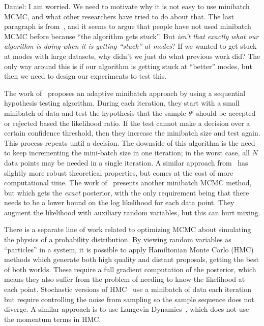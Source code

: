 \documentclass{article}
\begin{document}
{\color{blue}
Daniel: I am worried. We need to motivate why it is not easy to use minibatch MCMC, and what other
researchers have tried to do about that.  The last paragraph is from~\cite{cutting_mh_2014}, and it
seems to argue that people have not used minibatch MCMC before because ``the algorithm gets stuck''.
But \emph{isn't that exactly what our algorithm is doing when it is getting ``stuck'' at modes}? If
we wanted to get stuck at modes with large datasets, why didn't we just do what previous work did?
The only way around this is if our algorithm is getting stuck at ``better'' modes, but then we need
to design our experiments to test this.
}

The work of~\cite{cutting_mh_2014} proposes an adaptive minibatch approach by using a sequential
hypothesis testing algorithm. During each iteration, they start with a small minibatch of data and
test the hypothesis that the sample $\theta'$ should be accepted or rejected based the likelihood
ratio. If the test cannot make a decision over a certain confidence threshold, then they increase
the minibatch size and test again. This process repeats until a decision.  The downside of this
algorithm is the need to keep incrementing the mini-batch size in one iteration; in the worst case,
all $N$ data points may be needed in a single iteration. A similar approach
from~\cite{icml2014c1_bardenet14} has slightly more robust theoretical properties, but comes at the
cost of more computational time. The work of~\cite{conf/uai/MaclaurinA14} presents another minibatch
MCMC method, but which gets the \emph{exact} posterior, with the only requirement being that there
needs to be a lower bound on the log likelihood for each data point. They augment the likelihood
with auxiliary random variables, but this can hurt mixing.

There is a separate line of work related to optimizing MCMC about simulating the physics of a
probability distribution. By viewing random variables as ``particles'' in a system, it is possible
to apply Hamiltonian Monte Carlo (HMC)~\cite{mcmc_hamiltonian_2010} methods which generate both high
quality and distant proposals, getting the best of both worlds. These require a full gradient
computation of the posterior, which means they also suffer from the problem of needing to know the
likelihood at each point. Stochastic versions of HMC~\cite{sghmc_2014,stochastic_thermostats_2014}
use a minibatch of data each iteration but require controlling the noise from sampling so the sample
sequence does not diverge. A similar approach is to use Langevin
Dynamics~\cite{langevin_2011,conf/icml/AhnBW12}, which does not use the momentum terms in HMC.
\end{document}
